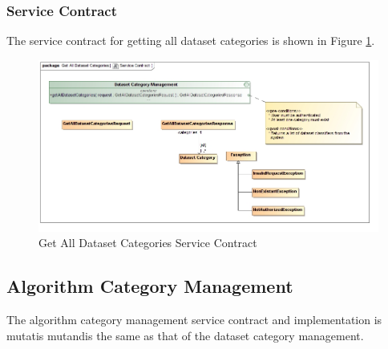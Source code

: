 \subsubsection{Service Contract}
The service contract for getting all dataset categories is shown in 
Figure \ref{fig:getAllDatasetCategoriesServiceContract}.
\begin{figure}[H]
  \begin{center}
  \includegraphics[scale=0.38]{../Diagrams and Charts/Repository Management/Get All Dataset Categories Service Contract.jpg}
  \caption{Get All Dataset Categories Service Contract}
  \label{fig:getAllDatasetCategoriesServiceContract}
  \end{center}
\end{figure}



\subsection{Algorithm Category Management}
The algorithm category management service contract and implementation is 
mutatis mutandis the same as that of the dataset category management.
